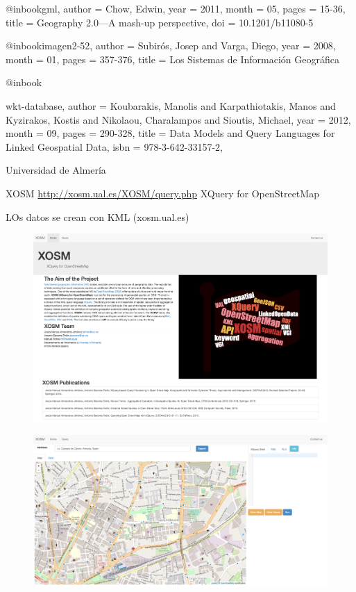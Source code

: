 @inbook{gml,
	author = {Chow, Edwin},
	year = {2011},
	month = {05},
	pages = {15-36},
	title = {Geography 2.0—A mash-up perspective},
	doi = {10.1201/b11080-5}
}

@inbook{imagen2-52,
	author = {Subirós, Josep and Varga, Diego},
	year = {2008},
	month = {01},
	pages = {357-376},
	title = {Los Sistemas de Información Geográfica}
}

@inbook{wkt-database,
	author = {Koubarakis, Manolis and Karpathiotakis, Manos and Kyzirakos, Kostis and Nikolaou, Charalampos and Sioutis, Michael},
	year = {2012},
	month = {09},
	pages = {290-328},
	title = {Data Models and Query Languages for Linked Geospatial Data},
	isbn = {978-3-642-33157-2},
	
}

Universidad de Almería 

XOSM \url{http://xosm.ual.es/XOSM/query.php} XQuery for OpenStreetMap

LOs datos se crean con KML (xosm.ual.es)

\begin{figure}[H]
	\centering
	\includegraphics[width=0.7\linewidth]{imagenes/capitulo6/1}
	\caption{}
	\label{fig:1-6}
\end{figure}
\begin{figure}[H]
	\centering
	\includegraphics[width=0.7\linewidth]{imagenes/capitulo6/2}
	\caption{}
	\label{fig:2-6}
\end{figure}

